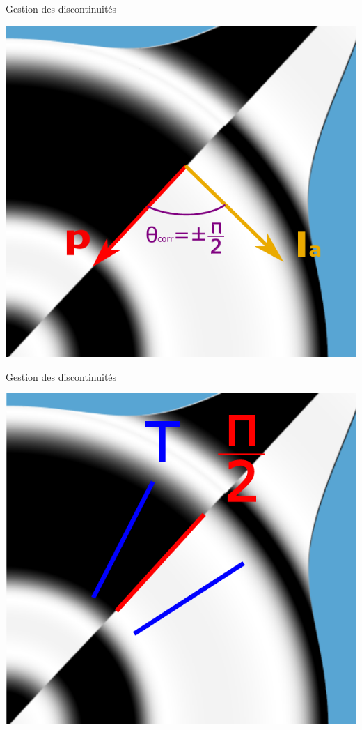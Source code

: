 \documentclass{beamer}
\begin{document}
\begin{frame}{Gestion des discontinuités}

\begin{center}
\includegraphics[width=0.6\linewidth]{Schema/orientationTheta_Image_discontinue_1.pdf}
\end{center}

	


\end{frame}


\begin{frame}{Gestion des discontinuités}

\begin{center}
\includegraphics[width=0.6\linewidth]{Schema/orientationTheta_Image_discontinue_2.pdf}
\end{center}

	

\end{frame}
\end{document}
